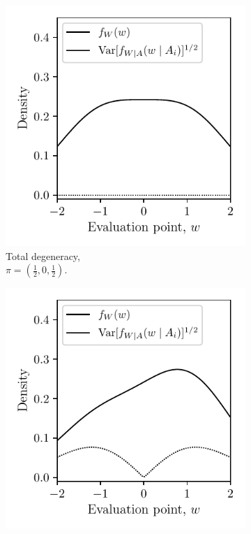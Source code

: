 \begin{figure}[ht]
  \centering
  \begin{subfigure}{0.32\textwidth}
    \centering
    \includegraphics[scale=0.64]{graphics/distribution_plot_total.pdf}
    \caption{Total degeneracy, \\
    $\pi = \left( \frac{1}{2}, 0, \frac{1}{2} \right)$.}
  \end{subfigure}
  \begin{subfigure}{0.32\textwidth}
    \centering
    \includegraphics[scale=0.64]{graphics/distribution_plot_partial.pdf}

\end{subfigure}
\end{figure}
